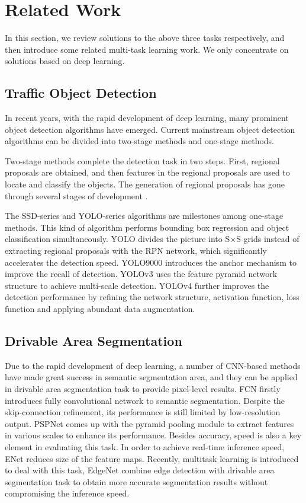 \documentclass[10pt,twocolumn,letterpaper]{article}
\begin{document}
\section{Related Work}
In this section, we review solutions to the above three tasks respectively, and then introduce some related multi-task learning work. We only concentrate on solutions based on deep learning.

\subsection{Traffic Object Detection}
In recent years, with the rapid development of deep learning, many prominent object detection algorithms have emerged. Current mainstream object detection algorithms can be divided into two-stage methods and one-stage methods.

Two-stage methods complete the detection task in two steps. First, regional proposals are obtained, and then features in the regional proposals are used to locate and classify the objects. The generation of regional proposals has gone through several stages of development \cite{rcnn,fast-rcnn,faster-rcnn,r-fcn}. 

The SSD-series \cite{ssd} and YOLO-series algorithms are milestones among one-stage methods. This kind of algorithm performs bounding box regression and object classification simultaneously. YOLO \cite{yolo} divides the picture into S$\times$S grids instead of extracting regional proposals with the RPN network, which significantly accelerates the detection speed.
YOLO9000 \cite{yolov2} introduces the anchor mechanism to improve the recall of detection. YOLOv3 \cite{yolov3} uses the feature pyramid network structure to achieve multi-scale detection. YOLOv4 \cite{yolov4} further improves the detection performance by refining the network structure, activation function, loss function and applying abundant data augmentation.

\subsection{Drivable Area Segmentation}
Due to the rapid development of deep learning, a number of CNN-based methods have made great success in semantic segmentation area, and they can be applied in drivable area segmentation task to provide pixel-level results. FCN \cite{fcn} firstly introduces fully convolutional network to semantic segmentation. Despite the skip-connection refinement, its performance is still limited by low-resolution output. PSPNet \cite{pspnet} comes up with the pyramid pooling module to extract features in various scales to enhance its performance. Besides accuracy, speed is also a key element in evaluating this task. In order to achieve real-time inference speed, ENet \cite{enet} reduces size of the feature maps. Recently, multitask learning is introduced to deal with this task, EdgeNet \cite{edgenet} combine edge detection with drivable area segmentation task to obtain more accurate segmentation results without compromising the inference speed.
\end{document}
